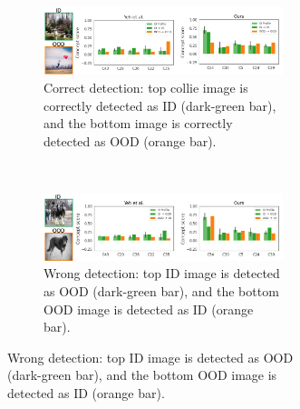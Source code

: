 \begin{figure}[hbt]
     
     \begin{subfigure}[b]{0.7\textwidth}
     \centering
     \begin{subfigure}{\textwidth}
         \centering
         \includegraphics[width=\textwidth]{figures/fig3a.png}
         \caption{\small Correct detection: top collie image is correctly detected as ID (dark-green bar), and the bottom image is correctly detected as OOD (orange bar).}
         \label{fig:collie-correct}
     \end{subfigure}
     \\
     \begin{subfigure}{\textwidth}
         \centering
         \includegraphics[width=\textwidth]{figures/fig3b.png}
         \caption{\small Wrong detection: top ID image is detected as OOD (dark-green bar), and the bottom OOD image is detected as ID (orange bar).}
         \label{fig:collie-wrong}
     \end{subfigure}
     \end{subfigure}
     \hspace{2mm}
     \begin{subfigure}[b]{0.23\textwidth}
         \centering

\end{subfigure}
\end{figure}
